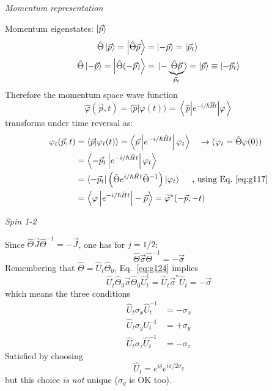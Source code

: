 \documentclass[12pt]{article}
\newcommand{\be}{\begin{equation}}
\newcommand{\ee}{\end{equation}}
\begin{document}
\emph{Momentum representation}

Momentum eigenstates: $\ket{\vec{p}}$
\be
\begin{aligned}
\hat{\Theta}\ket{\vec{p}} = \ket{\hat{\Theta}\vec{p}} 
&= \ket{-\vec{p}} = \ket{\vec{p}_t}\\
\hat{\Theta}\ket{-\vec{p}} = \ket{\hat{\Theta}(-\vec{p})} 
&= \ket*{-\underbrace{\hat{\Theta}\vec{p}}%
_{\vec{p}_t}
} 
= \ket{\vec{p}} \equiv \ket{-\vec{p}_t}
\end{aligned}
\ee
Therefore the momentum space wave function
\be
\hat{\varphi}(\vec{p}, t)=\langle\hat{p} | \varphi(t)\rangle=\left\langle\hat{p}\left|e^{-i / \hbar \hat{H} t}\right| \varphi\right\rangle
\ee
transforms under time reversal as:
\be
\begin{aligned}
\varphi_{t}(\vec{p}, t)
&=\left\langle\vec{p} | \varphi_{t}(t)\right\rangle=\left\langle \vec{p}\left|e^{-i / \hbar \hat{H} t}\right| \varphi_{t}\right\rangle\quad\rightarrow(\varphi_{t} = \hat{\Theta} \varphi(0))\\
&=\left\langle-\vec{p}_{t}\left|e^{-i / \hbar\hat{H} t}\right| \varphi_{t}\right\rangle\\
&=\left\langle-\vec{p}_{t}\right|\left(\hat{\Theta} e^{i / \hbar \hat{H} t} \hat{\Theta}^{-1}\right)
\left|\varphi_{t}\right\rangle
\quad\text{ , using Eq.~\eqref{eq:g117}}\\
&=\left\langle\varphi\left|e^{-i/ \hbar \hat{H} t}\right|-\vec{p}\right\rangle
=\widetilde{\varphi}^{*}(-\vec{p},-t)
\end{aligned}
\ee


\emph{Spin 1-2}

Since $\hat{\Theta}\vec{J}\hat{\Theta}^{-1} = -\vec{J}$, one has for $j=1/2$:
\be
\hat{\Theta} \vec{\sigma} \hat{\Theta}^{-1} = -\vec{\sigma}
\label{eq:g124}
\ee
Remembering that  
$\hat{\Theta} = \hat{U}_t\hat{\Theta}_0$, Eq.~\eqref{eq:g124} implies
\be
\hat{U}_{t} \hat{\Theta}_{0} \vec{\sigma} \hat{\Theta}_{0} \hat{U}_{t}^{\dagger}=
\hat{U}_{t} \vec{\sigma}^{*} \hat{U}_{t}=-\vec{\sigma}
\ee
which means the three conditions
\[
\begin{aligned}
\hat{U}_{t} \sigma_{x} \hat{U}_{t}^{-1} &=-\sigma_{x} \\ 
\hat{U}_{t} \sigma_{y} U_{t}^{-1}       &=+\sigma_{y} \\ 
\hat{U}_{t} \sigma_{z} \hat{U}_{t}^{-1} &=-\sigma_{z}
\end{aligned}
\]
Satisfied by choosing
\be
\hat{U}_{t}=e^{i \delta} e^{i \pi / 2 \sigma_{y}}
\ee
but this choice \emph{is not} unique ($\sigma_y$ is OK too).
\end{document}
